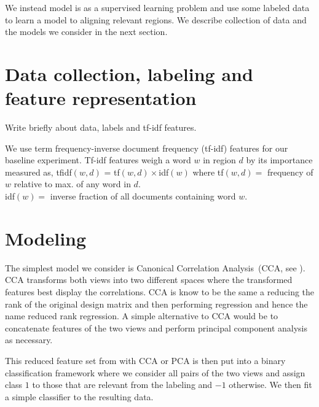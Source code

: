 \documentclass[11pt]{article} %
\begin{document}
We instead model is as a supervised learning problem and use some labeled data to learn a model to aligning relevant regions.
We describe collection of data and the models we consider in the next section.


\section{Data collection, labeling and feature representation}
Write briefly about data, labels and tf-idf features.

We use term frequency-inverse document frequency (tf-idf) features for our baseline experiment.
Tf-idf features weigh a word $w$ in region $d$ by its importance measured as,
tfidf$(w,d)$ = tf$(w,d)\times$idf$(w)$ where 
tf$(w,d)=$ frequency of $w$ relative to max. of any word in $d$.\\
idf$(w)=$ inverse fraction of all documents containing word $w$.

\section{Modeling}
The simplest model we consider is Canonical Correlation Analysis~(CCA, see \cite{hastie_book, bishop_book}).
CCA transforms both views into two different spaces where the transformed features best display the correlations.
CCA is know to be the same a reducing the rank of the original design matrix and then performing regression and hence the name reduced rank regression.
A simple alternative to CCA would be to concatenate features of the two views and perform principal component analysis as necessary.

This reduced feature set from with CCA or PCA is then put into a binary classification framework where we consider all pairs of the two views and assign class $1$ to those that are relevant from the labeling and $-1$ otherwise.
We then fit a simple classifier to the resulting data.



\end{document}
